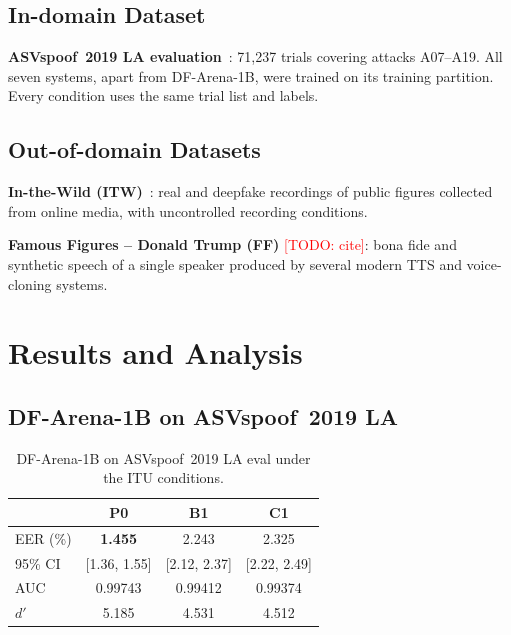 \documentclass[conference]{IEEEtran}
\newcommand{\todo}[1]{\textcolor{red}{[TODO: #1]}}
\begin{document}
\subsection{In-domain Dataset}

\textbf{ASVspoof~2019 LA evaluation}~\cite{wang2020asvspoof}: 71{,}237
trials covering attacks A07--A19. All seven systems, apart from DF-Arena-1B,
were trained on its training partition. Every condition uses the same
trial list and labels.

\subsection{Out-of-domain Datasets}

\textbf{In-the-Wild (ITW)}~\cite{muller2022itw}: real and deepfake
recordings of public figures collected from online media, with
uncontrolled recording conditions.

\textbf{Famous Figures -- Donald Trump (FF)} \todo{cite}: bona fide and
synthetic speech of a single speaker produced by several modern TTS and
voice-cloning systems.

\section{Results and Analysis}

\subsection{DF-Arena-1B on ASVspoof~2019 LA}

\begin{table}[t]
\centering
\caption{DF-Arena-1B on ASVspoof~2019 LA eval under the ITU conditions.}
\label{tab:dfa_itu}
\begin{tabular}{lccc}
\toprule
 & P0 & B1 & C1 \\
\midrule
EER (\%) & \textbf{1.455} & 2.243 & 2.325 \\
95\% CI  & [1.36, 1.55] & [2.12, 2.37] & [2.22, 2.49] \\
AUC      & 0.99743 & 0.99412 & 0.99374 \\
$d'$     & 5.185 & 4.531 & 4.512 \\
\bottomrule
\end{tabular}
\end{table}
\end{document}
